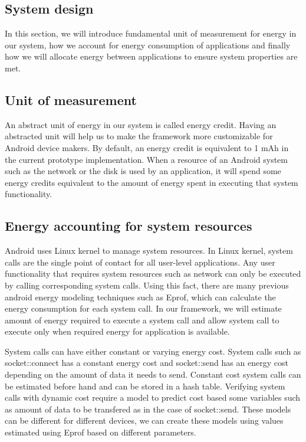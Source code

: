 \subsection{System design}


In this section, we will introduce fundamental unit of measurement for energy in our system, how we account for energy consumption of applications and finally how we will allocate energy between applications to ensure system properties are met.

\subsection{Unit of measurement}

An abstract unit of energy in our system is called energy credit. Having an abstracted unit will help us to make the framework more customizable for Android device makers. By default, an energy credit is equivalent to 1 mAh in the current prototype implementation. When a resource of an Android system such as the network or the disk is used by an application, it will spend some energy credits equivalent to the amount of energy spent in executing that system functionality.

\subsection{Energy accounting for system resources }

Android uses Linux kernel to manage system resources. In Linux kernel, system calls are the single point of contact for all user-level applications. Any user functionality that requires system resources such as network can only be executed by calling corresponding system calls. Using this fact, there are many previous android energy modeling techniques such as Eprof, which can calculate the energy consumption for each system call. In our framework, we will estimate amount of energy required to execute a system call and allow system call to execute only when required energy for application is available.

System calls can have either constant or varying energy cost. System calls such as socket::connect has a constant energy cost and socket::send has an energy cost depending on the amount of data it needs to send. Constant cost system calls can be estimated before hand and can be stored in a hash table. Verifying system calls with dynamic cost require a model to predict cost based some variables such as amount of data to be transfered as in the case of socket::send. These models can be different for different devices, we can create these models using values estimated using Eprof based on different parameters.

